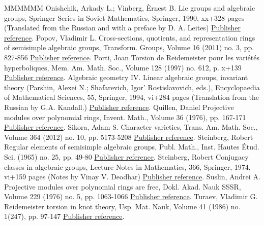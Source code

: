 \documentclass[11pt]{article}
\theoremstyle{definition}
\numberwithin{equation}{section}
\numberwithin{figure}{section}
\numberwithin{table}{section}
\begin{document}
\begin{thebibliography}{MMMMMM}
 Onishchik, Arkady L.; Vinberg, Èrnest B. Lie groups and algebraic groups, Springer Series in Soviet Mathematics, Springer, 1990, xx+328 pages (Translated from the Russian and with a preface by D. A. Leites) \href{https://ahl.centre-mersenne.org/item/AHL_2020__3__341_0/#OV}{Publisher reference}.
 Popov, Vladimir L. Cross-sections, quotients, and representation rings of semisimple algebraic groups, Transform. Groups, Volume 16 (2011) no. 3, pp. 827-856 \href{https://ahl.centre-mersenne.org/item/AHL_2020__3__341_0/#Popov}{Publisher reference}.
 Porti, Joan Torsion de Reidemeister pour les variétés hyperboliques, Mem. Am. Math. Soc., Volume 128 (1997) no. 612, p. x+139 \href{https://ahl.centre-mersenne.org/item/AHL_2020__3__341_0/#Porti}{Publisher reference}.
 Algebraic geometry IV. Linear algebraic groups, invariant theory (Parshin, Alexei N.; Shafarevich, Igor’ Rostislavovich, eds.), Encyclopaedia of Mathematical Sciences, 55, Springer, 1994, vi+284 pages (Translation from the Russian by G.A. Kandall.) \href{https://ahl.centre-mersenne.org/item/AHL_2020__3__341_0/#AlgebraicGeometryIV}{Publisher reference}.
 Quillen, Daniel Projective modules over polynomial rings, Invent. Math., Volume 36 (1976), pp. 167-171 \href{https://ahl.centre-mersenne.org/item/AHL_2020__3__341_0/#Quillen}{Publisher reference}.
 Sikora, Adam S. Character varieties, Trans. Am. Math. Soc., Volume 364 (2012) no. 10, pp. 5173-5208 \href{https://ahl.centre-mersenne.org/item/AHL_2020__3__341_0/#Sikora12}{Publisher reference}.
 Steinberg, Robert Regular elements of semisimple algebraic groups, Publ. Math., Inst. Hautes Étud. Sci. (1965) no. 25, pp. 49-80 \href{https://ahl.centre-mersenne.org/item/AHL_2020__3__341_0/#SteinbergIHES}{Publisher reference}.
 Steinberg, Robert Conjugacy classes in algebraic groups, Lecture Notes in Mathematics, 366, Springer, 1974, vi+159 pages (Notes by Vinay V. Deodhar) \href{https://ahl.centre-mersenne.org/item/AHL_2020__3__341_0/#Steinberg}{Publisher reference}.
 Suslin, Andrei A. Projective modules over polynomial rings are free, Dokl. Akad. Nauk SSSR, Volume 229 (1976) no. 5, pp. 1063-1066 \href{https://ahl.centre-mersenne.org/item/AHL_2020__3__341_0/#Suslin}{Publisher reference}.
 Turaev, Vladimir G. Reidemeister torsion in knot theory, Usp. Mat. Nauk, Volume 41 (1986) no. 1(247), pp. 97-147 \href{https://ahl.centre-mersenne.org/item/AHL_2020__3__341_0/#TuraevKnotTheory}{Publisher reference}.

\end{thebibliography}
\end{document}
